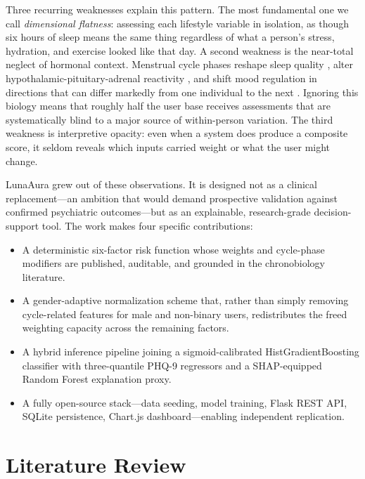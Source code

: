 \documentclass[conference]{IEEEtran}
\begin{document}
Three recurring weaknesses explain this pattern. The most fundamental one we call \emph{dimensional flatness}: assessing each lifestyle variable in isolation, as though six hours of sleep means the same thing regardless of what a person's stress, hydration, and exercise looked like that day. A second weakness is the near-total neglect of hormonal context. Menstrual cycle phases reshape sleep quality \cite{baker2007sleep}, alter hypothalamic-pituitary-adrenal reactivity \cite{mcewen2008central}, and shift mood regulation in directions that can differ markedly from one individual to the next \cite{kiesner2012menstrual}. Ignoring this biology means that roughly half the user base receives assessments that are systematically blind to a major source of within-person variation. The third weakness is interpretive opacity: even when a system does produce a composite score, it seldom reveals which inputs carried weight or what the user might change.

LunaAura grew out of these observations. It is designed not as a clinical replacement---an ambition that would demand prospective validation against confirmed psychiatric outcomes---but as an explainable, research-grade decision-support tool. The work makes four specific contributions:

\begin{itemize}
\item A deterministic six-factor risk function whose weights and cycle-phase modifiers are published, auditable, and grounded in the chronobiology literature.
\item A gender-adaptive normalization scheme that, rather than simply removing cycle-related features for male and non-binary users, redistributes the freed weighting capacity across the remaining factors.
\item A hybrid inference pipeline joining a sigmoid-calibrated HistGradientBoosting classifier with three-quantile PHQ-9 regressors and a SHAP-equipped Random Forest explanation proxy.
\item A fully open-source stack---data seeding, model training, Flask REST API, SQLite persistence, Chart.js dashboard---enabling independent replication.
\end{itemize}

\section{Literature Review}
\end{document}
